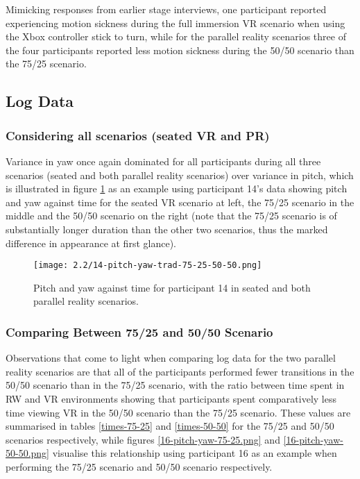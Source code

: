Mimicking responses from earlier stage interviews, one participant reported experiencing motion sickness during the full immersion VR scenario when using the Xbox controller stick to turn, while for the parallel reality scenarios three of the four participants reported less motion sickness during the 50/50 scenario than the 75/25 scenario.


\subsection{Log Data}

\subsubsection{Considering all scenarios (seated VR and PR)}

Variance in yaw once again dominated for all participants during all three scenarios (seated and both parallel reality scenarios) over variance in pitch, which is illustrated in figure \ref{14-pitch-yaw-trad-75-25-50-50.png} as an example using participant 14's data showing pitch and yaw against time for the seated VR scenario at left, the 75/25 scenario in the middle and the 50/50 scenario on the right (note that the 75/25 scenario is of substantially longer duration than the other two scenarios, thus the marked difference in appearance at first glance).

\begin{figure}[h]
	\begin{center}
	\texttt{[image: 2.2/14-pitch-yaw-trad-75-25-50-50.png]}
	\caption{Pitch and yaw against time for participant 14 in seated and both parallel reality scenarios.}
	\label{14-pitch-yaw-trad-75-25-50-50.png}
	\end{center}
\end{figure}


\subsubsection{Comparing Between 75/25 and 50/50 Scenario}

Observations that come to light when comparing log data for the two parallel reality scenarios are that all of the participants performed fewer transitions in the 50/50 scenario than in the 75/25 scenario, with the ratio between time spent in RW and VR environments showing that participants spent comparatively less time viewing VR in the 50/50 scenario than the 75/25 scenario. These values are summarised in tables \ref{times-75-25} and \ref{times-50-50} for the 75/25 and 50/50 scenarios respectively, while figures \ref{16-pitch-yaw-75-25.png} and \ref{16-pitch-yaw-50-50.png} visualise this relationship using participant 16 as an example when performing the 75/25 scenario and 50/50 scenario respectively.

